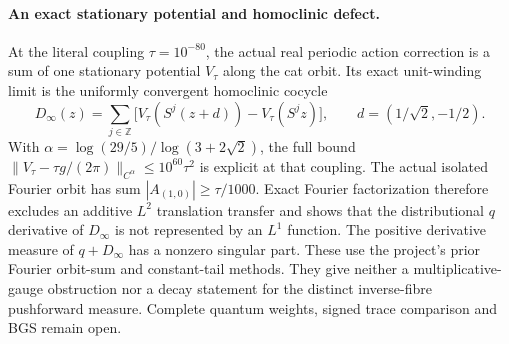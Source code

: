 \paragraph{An exact stationary potential and homoclinic defect.}
At the literal coupling $\tau=10^{-80}$, the actual real periodic action
correction is a sum of one stationary potential $V_\tau$ along the cat orbit.
Its exact unit-winding limit is the uniformly convergent homoclinic cocycle
\[
 D_\infty(z)=\sum_{j\in\mathbb Z}
 \bigl[V_\tau(S^j(z+d))-V_\tau(S^jz)\bigr],
 \qquad d=(1/\sqrt2,-1/2).
\]
With $\alpha=\log(29/5)/\log(3+2\sqrt2)$, the full bound
$\|V_\tau-\tau g/(2\pi)\|_{C^\alpha}\le10^{60}\tau^2$
is explicit at that coupling. The actual isolated Fourier orbit has sum
$|A_{(1,0)}|\ge\tau/1000$. Exact Fourier factorization therefore excludes
an additive $L^2$ translation transfer and shows that the distributional
$q$ derivative of $D_\infty$ is not represented by an $L^1$ function.
The positive derivative measure of $q+D_\infty$ has a nonzero singular part.
These use the project's prior Fourier orbit-sum and constant-tail methods.
They give neither a multiplicative-gauge obstruction nor a decay statement
for the distinct inverse-fibre pushforward measure. Complete quantum weights,
signed trace comparison and BGS remain open.
